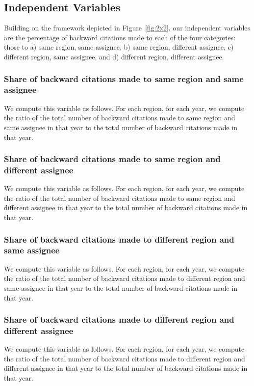 \documentclass[12pt,letterpaper]{article}
\begin{document}
\subsection{Independent Variables}
Building on the framework depicted in Figure~\ref{fig:2x2}, our independent variables are the percentage of backward citations made to each of the four categories: those to a) same region, same assignee, b) same region, different assignee, c) different region, same assignee, and d) different region, different assignee. \par
\subsubsection{Share of backward citations made to same region and same assignee}
We compute this variable as follows. For each region, for each year, we compute the ratio of the total number of backward citations made to same region and same assignee in that year to the total number of backward citations made in that year.
\subsubsection{Share of backward citations made to same region and different assignee}
We compute this variable as follows. For each region, for each year, we compute the ratio of the total number of backward citations made to same region and different assignee in that year to the total number of backward citations made in that year.
\subsubsection{Share of backward citations made to different region and same assignee}
We compute this variable as follows. For each region, for each year, we compute the ratio of the total number of backward citations made to different region and same assignee in that year to the total number of backward citations made in that year.
\subsubsection{Share of backward citations made to different region and different assignee}
We compute this variable as follows. For each region, for each year, we compute the ratio of the total number of backward citations made to different region and different assignee in that year to the total number of backward citations made in that year.\par
\end{document}
